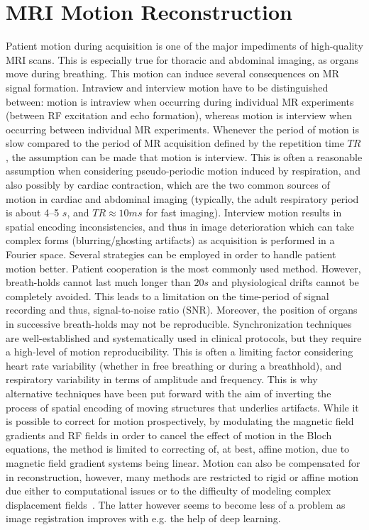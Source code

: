 \documentclass[english,version-2022-01]{uzl-thesis} %
\begin{document}
\section{MRI Motion Reconstruction} \label{Sec:MRI_MotionReconstruction}
Patient motion during acquisition is one of the major impediments of high-quality MRI scans. This is especially true for thoracic and abdominal imaging, as organs move during breathing. This motion can induce several consequences on MR signal formation. Intraview and interview motion have to be distinguished between: motion is intraview when occurring during individual MR experiments (between RF excitation and echo formation), whereas motion is interview when occurring between individual MR experiments. Whenever the period of motion is slow compared to the period of MR acquisition defined by the repetition time $TR$, the assumption can be made that motion is interview. This is often a reasonable assumption when considering pseudo-periodic motion induced by respiration, and also possibly by cardiac contraction, which are the two common sources of motion in cardiac and abdominal imaging (typically, the adult respiratory period is about 4–5 $s$, and $TR \approx 10 ms$ for fast imaging). Interview motion results in spatial encoding inconsistencies, and thus in image deterioration which can take complex forms (blurring/ghosting artifacts) as acquisition is performed in a Fourier space. Several strategies can be employed in order to handle patient motion better. Patient cooperation is the most commonly used method. However, breath-holds cannot last much longer than $20 s$ and physiological drifts cannot be completely avoided. This leads to a limitation on the time-period of signal recording and thus, signal-to-noise ratio (SNR). Moreover, the position of organs in successive breath-holds may not be reproducible. Synchronization techniques are well-established and systematically used in clinical protocols, but they require a high-level of motion reproducibility. This is often a limiting factor considering heart rate variability (whether in free breathing or during a breathhold), and respiratory variability in terms of amplitude and frequency. This is why alternative techniques have been put forward with the aim of inverting the process of spatial encoding of moving structures that underlies artifacts. While it is possible to correct for motion prospectively, by modulating the magnetic field gradients and RF fields in order to cancel the effect of motion in the Bloch equations, the method is limited to correcting of, at best, affine motion, due to magnetic field gradient systems being linear. Motion can also be compensated for in reconstruction, however, many methods are restricted to rigid or affine motion due either to computational issues or to the difficulty of modeling complex displacement fields~\cite{GRICS}. The latter however seems to become less of a problem as image registration improves with e.g. the help of deep learning.\\
\end{document}
